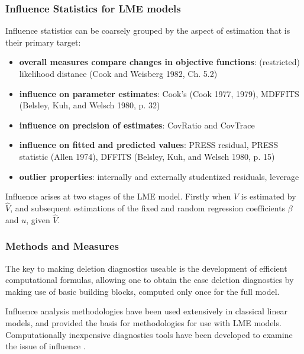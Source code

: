 \documentclass[12pt, a4paper]{report}
\theoremstyle{plain}
\theoremstyle{definition}
\theoremstyle{remark}
\begin{document}
	\subsubsection{Influence Statistics for LME models} %
	Influence statistics can be coarsely grouped by the aspect of estimation that is their primary target:
	\begin{itemize}
		\item \textbf{overall measures compare changes in objective functions}: (restricted) likelihood distance (Cook and Weisberg 1982, Ch. 5.2)
		\item \textbf{influence on parameter estimates}: Cook's  (Cook 1977, 1979), MDFFITS (Belsley, Kuh, and Welsch 1980, p. 32)
		\item \textbf{influence on precision of estimates}: CovRatio and CovTrace
		\item \textbf{influence on fitted and predicted values}: PRESS residual, PRESS statistic (Allen 1974), DFFITS (Belsley, Kuh, and Welsch 1980, p. 15)
		\item \textbf{outlier properties}: internally and externally studentized residuals, leverage
	\end{itemize}
	
	Influence arises at two stages of the LME model. Firstly when $V$ is estimated by $\hat{V}$, and subsequent
	estimations of the fixed and random regression coefficients $\beta$ and $u$, given $\hat{V}$.
	

	\subsubsection{Methods and Measures}
	The key to making deletion diagnostics useable is the development of efficient computational formulas, allowing one to obtain the  case deletion diagnostics by making use of basic building blocks, computed only once for the full model.
	
		Influence analysis methodologies have been used extensively in classical linear models, and provided the basis for methodologies for use with LME models.
		Computationally inexpensive diagnostics tools have been developed to examine the issue of influence \citep{Zewotir}.
		
\end{document}
